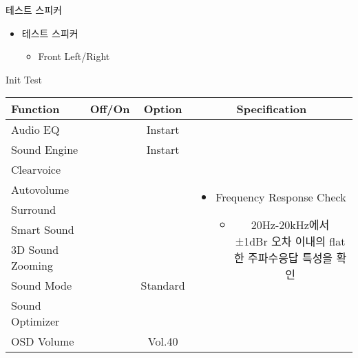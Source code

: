 \begin{frame}[t]{테스트 스피커}
\begin{itemize}
\huge \item 테스트 스피커
	\begin{itemize}
	\large \item Front Left/Right
	\end{itemize}
\end{itemize}
\end{frame}

\begin{frame}[t]{Init Test}
\begin{tiny}
\begin{tabular}{@{}lccc@{}}
\toprule
Function & Off/On & Option & Specification \\
\midrule
Audio EQ & \color{black}{Off} & Instart &
\multirow{10}{60mm}{
\begin{itemize}\vspace{-3mm}
\item Frequency Response Check
	\begin{itemize}
	\item 20Hz-20kHz에서 ±1dBr 오차 이내의 flat한 주파수응답 특성을 확인
	\end{itemize}
\end{itemize}
} \\
Sound Engine & \color{blue}{On} & Instart & \\
Clearvoice & \color{black}{Off} & & \\
Autovolume & \color{black}{Off} & & \\
Surround & \color{black}{Off} & & \\
Smart Sound & \color{black}{Off} & & \\
3D Sound Zooming & \color{black}{Off} & & \\
Sound Mode & \color{blue}{On} & Standard & \\
Sound Optimizer & \color{black}{Off} & & \\
OSD Volume & \color{blue}{On} & Vol.40 & \\
\midrule
\end{tabular}
\end{tiny}

\end{frame}

